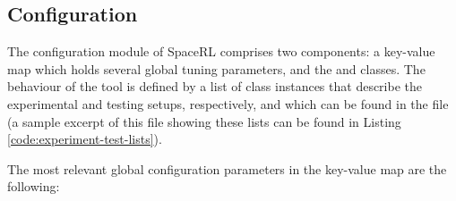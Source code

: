 \subsection{Configuration}\label{sec:framework-config} 

The configuration module of SpaceRL comprises two components: a key-value map which holds several global tuning parameters, and the  and  classes. The behaviour of the tool is defined by a list of class instances that describe the experimental and testing setups, respectively, and which can be found in the  file (a sample excerpt of this file showing these lists can be found in Listing \ref{code:experiment-test-lists}).

The most relevant global configuration parameters in the key-value map are the following:

